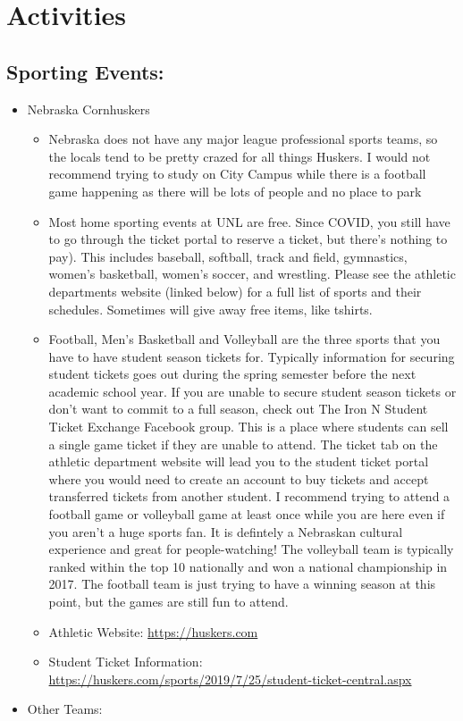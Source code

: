 \documentclass[
  12pt,
]{book}
\providecommand{\tightlist}{%
  \setlength{\itemsep}{0pt}\setlength{\parskip}{0pt}}
\begin{document}
\hypertarget{activities}{%
\section{Activities}\label{activities}}

\hypertarget{sporting-events}{%
\subsection{Sporting Events:}\label{sporting-events}}

\begin{itemize}
\tightlist
\item
  Nebraska Cornhuskers

  \begin{itemize}
  \tightlist
  \item
    Nebraska does not have any major league professional sports teams, so the locals tend to be pretty crazed for all things Huskers. I would not recommend trying to study on City Campus while there is a football game happening as there will be lots of people and no place to park
  \item
    Most home sporting events at UNL are free. Since COVID, you still have to go through the ticket portal to reserve a ticket, but there's nothing to pay). This includes baseball, softball, track and field, gymnastics, women's basketball, women's soccer, and wrestling. Please see the athletic departments website (linked below) for a full list of sports and their schedules. Sometimes will give away free items, like tshirts.
  \item
    Football, Men's Basketball and Volleyball are the three sports that you have to have student season tickets for. Typically information for securing student tickets goes out during the spring semester before the next academic school year. If you are unable to secure student season tickets or don't want to commit to a full season, check out The Iron N Student Ticket Exchange Facebook group. This is a place where students can sell a single game ticket if they are unable to attend. The ticket tab on the athletic department website will lead you to the student ticket portal where you would need to create an account to buy tickets and accept transferred tickets from another student. I recommend trying to attend a football game or volleyball game at least once while you are here even if you aren't a huge sports fan. It is defintely a Nebraskan cultural experience and great for people-watching! The volleyball team is typically ranked within the top 10 nationally and won a national championship in 2017. The football team is just trying to have a winning season at this point, but the games are still fun to attend.
  \item
    Athletic Website: \url{https://huskers.com}
  \item
    Student Ticket Information: \url{https://huskers.com/sports/2019/7/25/student-ticket-central.aspx}
  \end{itemize}
\item
  Other Teams:


\end{itemize}
\end{document}
